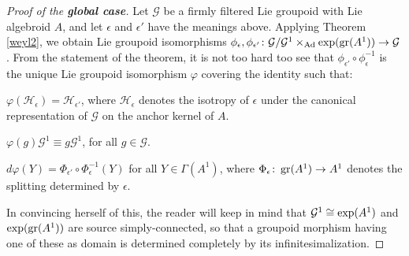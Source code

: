 \documentclass[leqno,12pt]{amsart} %
\begin{document}
\begin{proof}[Proof of the {\bfseries global case}]
  Let ${\mathcal G} $ be a firmly filtered Lie groupoid with Lie algebroid $A$, and let
  $\epsilon$ and $\epsilon'$ have the meanings above. Applying Theorem \ref{weyl2}, we
  obtain Lie groupoid isomorphisms
  $\phi_\epsilon, \phi_{\epsilon'} \colon {\mathcal G}/{\mathcal G}^1
  \times_{\operatorname{Ad}}\exp(\operatorname{\operatorname{gr}}(A^1)) \rightarrow {\mathcal G}$. From the statement of the
  theorem, it is not too hard too see that $\phi_{\epsilon'}\circ \phi_\epsilon^{-1} $ is
  the unique Lie groupoid isomorphism $\varphi$ covering the identity such that:
  \begin{conditions}
  \item \label{silver1} $\varphi({\mathcal H}_\epsilon) = {\mathcal H}_{\epsilon'}$, where
    ${\mathcal H}_\epsilon$ denotes the isotropy of $\epsilon $ under the canonical
    representation of ${\mathcal G}$ on the anchor kernel of $A$.
  \item \label{silver2} $\varphi(g){\mathcal G}^1 \equiv g {\mathcal G}^1$, for all
    $g \in {\mathcal G} $.
  \item \label{silver3} $d\varphi(Y) = \Phi_{\epsilon'}\circ \Phi_\epsilon^{-1}(Y)$ for all
    $Y\in \Gamma(A^1)$, where $\Phi_\epsilon \colon \operatorname{\operatorname{gr}}(A^1) \rightarrow A^1$ denotes
    the splitting determined by $\epsilon $.
  \end{conditions}
  In convincing herself of this, the reader will keep in mind that
  ${\mathcal G}^1\cong\exp(A^1)$ and $\exp(\operatorname{\operatorname{gr}}(A^1))$ are
  source simply-connected, so that a groupoid morphism having one of these as domain is
  determined completely by its infinitesimalization.


\end{proof}
\end{document}
